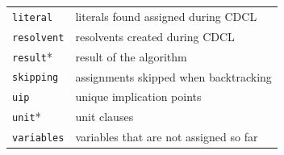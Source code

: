 \documentclass[11pt]{article}
\newcommand*{\p}[1]{\textup{\texttt{#1}}}
\begin{document}
\begin{center}
\begin{tabular}{|l|l|}
\p{literal}   &  literals found assigned during CDCL        \\
\p{resolvent} &  resolvents created during CDCL             \\
\p{result}*   &  result of the algorithm                    \\
\p{skipping}  &  assignments skipped when backtracking      \\
\p{uip}       &  unique implication points                   \\
\p{unit}*     &  unit clauses                               \\
\p{variables} &  variables that are not assigned so far     \\
\hline
\end{tabular}
\end{center}
\end{document}
